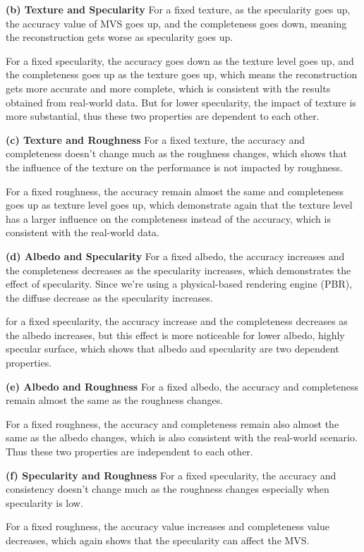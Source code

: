 \textbf{(b) Texture and Specularity} 
For a fixed texture, as the specularity goes up, the accuracy value of MVS goes up, and the completeness goes down, meaning the reconstruction gets worse as specularity goes up.

For a fixed specularity, the accuracy goes down as the texture level goes up, and the completeness goes up as the texture goes up, which means the reconstruction gets more accurate and more complete, which is consistent with the results obtained from real-world data. But for lower specularity, the impact of texture is more substantial, thus these two properties are dependent to each other.

\textbf{(c) Texture and Roughness} 
For a fixed texture, the accuracy and completeness doesn't change much as the roughness changes, which shows that the influence of the texture on the performance is not impacted by roughness.

For a fixed roughness, the accuracy remain almost the same and completeness goes up as texture level goes up, which demonstrate again that the texture level has a larger influence on the completeness instead of the accuracy, which is consistent with the real-world data.

\textbf{(d) Albedo and Specularity} 
For a fixed albedo, the accuracy increases and the completeness decreases as the specularity increases, which demonstrates the effect of specularity. Since we're using a physical-based rendering engine (PBR), the diffuse decrease as the specularity increases.

for a fixed specularity, the accuracy increase and the completeness decreases as the albedo increases, but this effect is more noticeable for lower albedo, highly specular surface, which shows that albedo and specularity are two dependent properties.

\textbf{(e) Albedo and Roughness} 
For a fixed albedo, the accuracy and completeness remain almost the same as the roughness changes.

For a fixed roughness, the accuracy and completeness remain also almost the same as the albedo changes, which is also consistent with the real-world scenario. Thus these two properties are independent to each other.

\textbf{(f) Specularity and Roughness} 
For a fixed specularity, the accuracy and consistency doesn't change much as the roughness changes especially when specularity is low.

For a fixed roughness, the accuracy value increases and completeness value decreases, which again shows that the specularity can affect the MVS.

